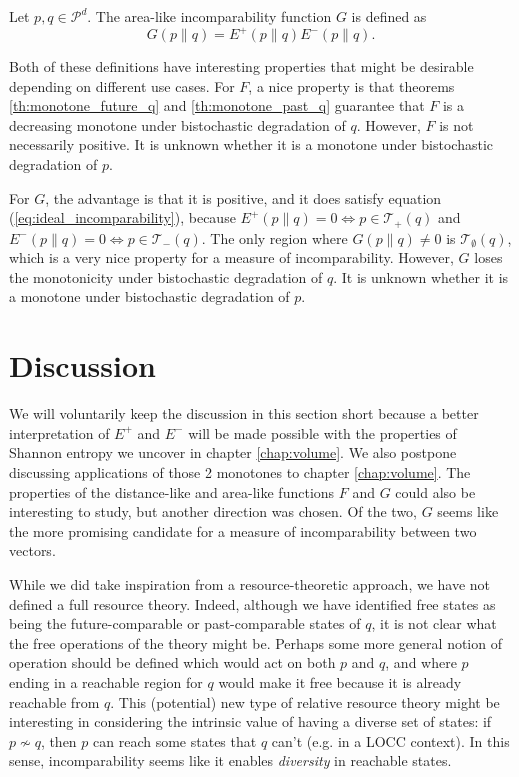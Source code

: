 \begin{definition} \label{def:area-like_function}
    Let $p, q \in \mathcal{P}^d$. The area-like incomparability function $G$ is defined as 
    \begin{equation}
        G(p \parallel q) = E^+(p \parallel q) E^-(p \parallel q).
    \end{equation}
\end{definition}

Both of these definitions have interesting properties that might be desirable depending on different use cases. For $F$, a nice property is that theorems \ref{th:monotone_future_q} and \ref{th:monotone_past_q} guarantee that $F$ is a decreasing monotone under bistochastic degradation of $q$. However, $F$ is not necessarily positive. It is unknown whether it is a monotone under bistochastic degradation of $p$.

For $G$, the advantage is that it is positive, and it does satisfy equation (\ref{eq:ideal_incomparability}), because $E^+(p \parallel q) = 0 \iff p \in \mathcal{T}_+(q)$ and $E^-(p \parallel q) = 0 \iff p \in \mathcal{T}_-(q)$. The only region where $G(p \parallel q) \neq 0$ is $\mathcal{T}_\emptyset(q)$, which is a very nice property for a measure of incomparability. However, $G$ loses the monotonicity under bistochastic degradation of $q$. It is unknown whether it is a monotone under bistochastic degradation of $p$.

\section{Discussion}

We will voluntarily keep the discussion in this section short because a better interpretation of $E^+$ and $E^-$ will be made possible with the properties of Shannon entropy we uncover in chapter \ref{chap:volume}. We also postpone discussing applications of those 2 monotones to chapter \ref{chap:volume}. The properties of the distance-like and area-like functions $F$ and $G$ could also be interesting to study, but another direction was chosen. Of the two, $G$ seems like the more promising candidate for a measure of incomparability between two vectors.

While we did take inspiration from a resource-theoretic approach, we have not defined a full resource theory. Indeed, although we have identified free states as being the future-comparable or past-comparable states of $q$, it is not clear what the free operations of the theory might be. Perhaps some more general notion of operation should be defined which would act on both $p$ and $q$, and where $p$ ending in a reachable region for $q$ would make it free because it is already reachable from $q$. This (potential) new type of relative resource theory might be interesting in considering the intrinsic value of having a diverse set of states: if $p \nsim q$, then $p$ can reach some states that $q$ can't (e.g. in a LOCC context). In this sense, incomparability seems like it enables \textit{diversity} in reachable states.

